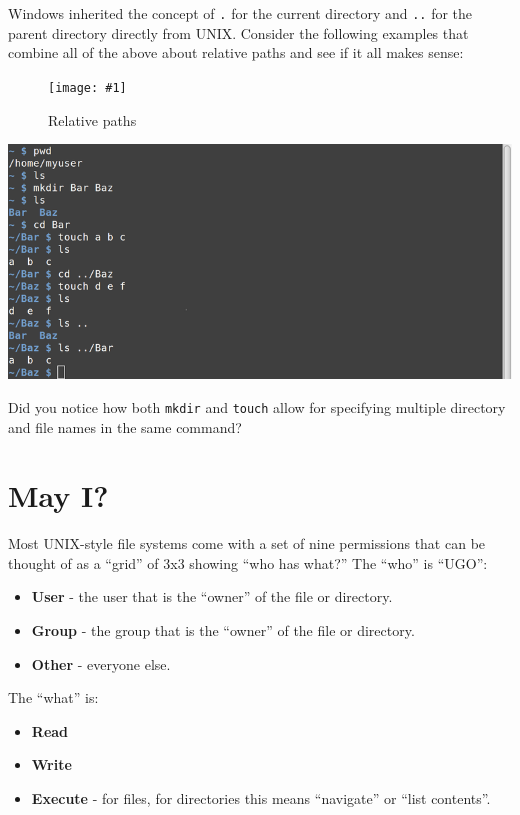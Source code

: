 \documentclass[10pt,]{book}
\numberwithin{figure}{chapter}
\DeclareRobustCommand{\fimg}[3]{
\ifxetex
\begin{figure}[H]
\texttt{[image: \#1]}
\caption{#2}
\label{fig:#3}
\end{figure}
\fi}
\begin{document}
Windows inherited the concept of \texttt{.} for the current directory
and \texttt{..} for the parent directory directly from UNIX. Consider
the following examples that combine all of the above about relative
paths and see if it all makes sense:

\ifxetex\fimg{./images/relative-paths.png}{Relative paths}{relative-paths}
\else
\includegraphics{./images/relative-paths.png} \fi

Did you notice how both \texttt{mkdir} and \texttt{touch} allow for
specifying multiple directory and file names in the same command?

\section{May I?}\label{may-i}

Most UNIX-style file systems come with a set of nine permissions that
can be thought of as a ``grid'' of 3x3 showing ``who has what?'' The
``who'' is ``UGO'':

\begin{itemize}
\item
  \textbf{User} - the user that is the ``owner'' of the file or
  directory.
\item
  \textbf{Group} - the group that is the ``owner'' of the file or
  directory.
\item
  \textbf{Other} - everyone else.
\end{itemize}

The ``what'' is:

\begin{itemize}
\item
  \textbf{Read}
\item
  \textbf{Write}
\item
  \textbf{Execute} - for files, for directories this means ``navigate''
  or ``list contents''.
\end{itemize}
\end{document}

